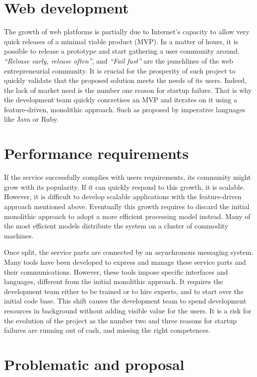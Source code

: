 \section{Web development}

The growth of web platforms is partially due to Internet's capacity to allow very quick releases of a minimal viable product (MVP).
In a matter of hours, it is possible to release a prototype and start gathering a user community around.
\textit{``Release early, release often''}, and \textit{``Fail fast''} are the punchlines of the web entrepreneurial community.
It is crucial for the prosperity of such project to quickly validate that the proposed solution meets the needs of its users.
Indeed, the lack of market need is the number one reason for startup failure.
That is why the development team quickly concretises an MVP and iterates on it using a feature-driven, monolithic approach.
Such as proposed by imperative languages like Java or Ruby.

\section{Performance requirements}

If the service successfully complies with users requirements, its community might grow with its popularity.
If it can quickly respond to this growth, it is scalable.
However, it is difficult to develop scalable applications with the feature-driven approach mentioned above.
Eventually this growth requires to discard the initial monolithic approach to adopt a more efficient processing model instead.
Many of the most efficient models distribute the system on a cluster of commodity machines.

Once split, the service parts are connected by an asynchronous messaging system.
Many tools have been developed to express and manage these service parts and their communications.
However, these tools impose specific interfaces and languages, different from the initial monolithic approach.
It requires the development team either to be trained or to hire experts, and to start over the initial code base.
This shift causes the development team to spend development resources in background without adding visible value for the users.
It is a risk for the evolution of the project as the number two and three reasons for startup failures are running out of cash, and missing the right competences.

\section{Problematic and proposal}

